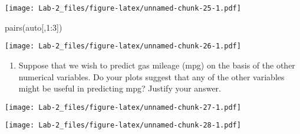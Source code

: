 \documentclass[
]{article}
\newenvironment{Shaded}{\begin{snugshade}}{\end{snugshade}}
\newcommand{\AttributeTok}[1]{\textcolor[rgb]{0.77,0.63,0.00}{#1}}
\newcommand{\DecValTok}[1]{\textcolor[rgb]{0.00,0.00,0.81}{#1}}
\newcommand{\FunctionTok}[1]{\textcolor[rgb]{0.00,0.00,0.00}{#1}}
\newcommand{\NormalTok}[1]{#1}
\newcommand{\SpecialCharTok}[1]{\textcolor[rgb]{0.00,0.00,0.00}{#1}}
\providecommand{\tightlist}{%
  \setlength{\itemsep}{0pt}\setlength{\parskip}{0pt}}
\begin{document}
\texttt{[image: Lab-2\_files/figure-latex/unnamed-chunk-25-1.pdf]}

\begin{Shaded}
\begin{Highlighting}[]
\FunctionTok{pairs}\NormalTok{(auto[,}\DecValTok{1}\SpecialCharTok{:}\DecValTok{3}\NormalTok{])}
\end{Highlighting}
\end{Shaded}

\texttt{[image: Lab-2\_files/figure-latex/unnamed-chunk-26-1.pdf]}

\begin{enumerate}
\def\labelenumi{\alph{enumi}.}
\setcounter{enumi}{4}
\tightlist
\item
  Suppose that we wish to predict gas mileage (mpg) on the basis of the
  other numerical variables. Do your plots suggest that any of the other
  variables might be useful in predicting mpg? Justify your answer.
\end{enumerate}

\begin{Shaded}
\end{Shaded}

\texttt{[image: Lab-2\_files/figure-latex/unnamed-chunk-27-1.pdf]}

\begin{Shaded}
\end{Shaded}

\texttt{[image: Lab-2\_files/figure-latex/unnamed-chunk-28-1.pdf]}

\begin{Shaded}
\end{Shaded}
\end{document}
